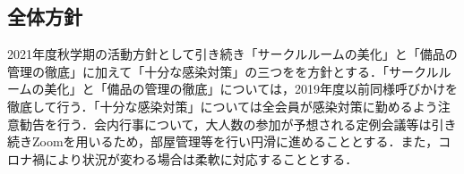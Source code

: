 \subsection*{全体方針}


2021年度秋学期の活動方針として引き続き「サークルルームの美化」と「備品の管理の徹底」に加えて「十分な感染対策」の三つをを方針とする．「サークルルームの美化」と「備品の管理の徹底」については，2019年度以前同様呼びかけを徹底して行う．「十分な感染対策」については全会員が感染対策に勤めるよう注意勧告を行う．会内行事について，大人数の参加が予想される定例会議等は引き続きZoomを用いるため，部屋管理等を行い円滑に進めることとする．また，コロナ禍により状況が変わる場合は柔軟に対応することとする．
